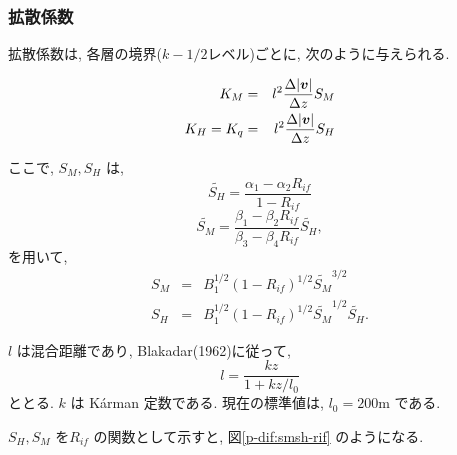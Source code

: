 \subsubsection{拡散係数}

拡散係数は,
各層の境界($k-1/2$レベル)ごとに,
次のように与えられる.

\begin{eqnarray}
K_M       & = & l^2 \frac{\Delta |\Dvect{v}|}{\Delta z} S_M  \\
K_H = K_q & = & l^2 \frac{\Delta |\Dvect{v}|}{\Delta z} S_H 
\end{eqnarray}

ここで, $S_M, S_H$ は,
\begin{equation}
\widetilde{S_H} = \frac{ \alpha_1-\alpha_2 R_{if} }{ 1-R_{if} }
\end{equation}
%
\begin{equation}
\widetilde{S_M} = \frac{ \beta_1-\beta_2 R_{if} }{ \beta_3-\beta_4 R_{if} } 
                  \widetilde{S_H} ,
\end{equation}
を用いて,
\begin{eqnarray}
S_M & = & B_1^{1/2} ( 1- R_{if} )^{1/2} 
          \widetilde{S_M}^{3/2} \\
S_H & = & B_1^{1/2} ( 1- R_{if} )^{1/2} 
          \widetilde{S_M}^{1/2} \widetilde{S_H} .
\end{eqnarray} 

$l$ は混合距離であり, Blakadar(1962)に従って,
\begin{equation}
l = \frac{kz}{1+kz/l_0}
\end{equation}
ととる. 
$k$ は K\'{a}rman 定数である. 
%
% 
現在の標準値は, $l_0=200$m である.

$S_H, S_M$ を$R_{if}$ の関数として示すと,
図\ref{p-dif:smsh-rif} のようになる.

